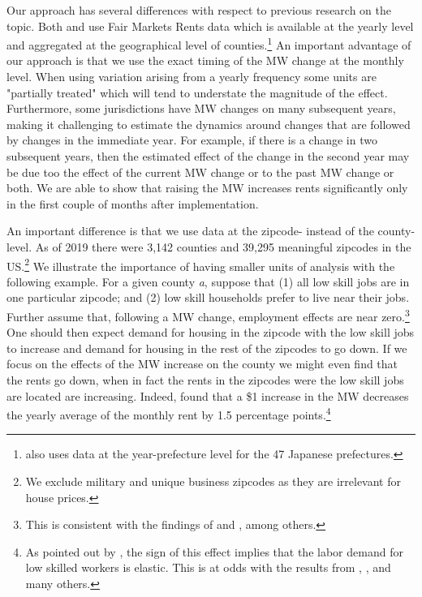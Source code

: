 Our approach has several differences with respect to previous research on the topic. Both 
\textcite{tidemann2018mw} and \textcite{yamagishi2019minimum} use Fair Markets Rents data which is 
available at the yearly level and aggregated at the geographical level of counties.\footnote{
	\textcite{yamagishi2019minimum} also uses data at the year-prefecture level for the 47 Japanese 
	prefectures.} 
An important advantage of our approach is that we use the exact timing of the MW change at the monthly 
level. When using variation arising from a yearly frequency some units are "partially treated" which 
will tend to understate the magnitude of the effect. Furthermore, some jurisdictions have MW changes 
on many subsequent years, making it challenging to estimate the dynamics around changes that are 
followed by changes in the immediate year. For example, if there is a change in two subsequent years, 
then the estimated effect of the change in the second year may be due too the effect of the current MW 
change or to the past MW change or both. We are able to show that raising the MW increases rents 
significantly only in the first couple of months after implementation.

An important difference is that we use data at the zipcode- instead of the county-level. As of 2019 
there were 3,142 counties and 39,295 meaningful zipcodes in the US.\footnote{We exclude military and 
unique business zipcodes as they are irrelevant for house prices.} We illustrate the importance of 
having smaller units of analysis with the following example. For a given county \textit{a}, suppose 
that (1) all low skill jobs are in one particular zipcode; and (2) low skill households prefer to live 
near their jobs. Further assume that, following a MW change, employment effects are near 
zero.\footnote{This is consistent with the findings of \textcite{card2000minimum} and 
	\textcite{cengiz2019effect}, among others.}
One should then expect demand for housing in the zipcode with the low skill jobs to increase and 
demand for housing in the rest of the zipcodes to go down. If we focus on the effects of the MW 
increase on the county we might even find that the rents go down, when in fact the rents in the 
zipcodes were the low skill jobs are located are increasing. Indeed, \textcite{tidemann2018mw} found 
that a \$1 increase in the MW decreases the yearly average of the monthly rent by 1.5 percentage 
points.\footnote{As pointed out by \textcite{tidemann2018mw}, the sign of this effect implies that 
	the labor demand for low skilled workers is elastic. This is at odds with the results from 
	\textcite{card2000minimum}, \textcite{cengiz2019effect}, and many others.}


